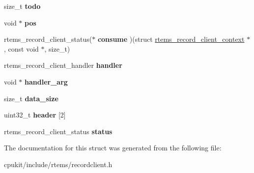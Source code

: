 \begin{DoxyCompactItemize}
\begin{tabbing}
\end{tabbing}\item 
\mbox{\label{structrtems__record__client__context_aa79b3338e18607f6ff8537067282a4dc}} 
size\+\_\+t {\bfseries todo}
\item 
\mbox{\label{structrtems__record__client__context_a1b188afbc958c16c9e7e906cd44de530}} 
void $\ast$ {\bfseries pos}
\item 
\mbox{\label{structrtems__record__client__context_ade1d2e487a5012c2ec3ca5fbecd09b71}} 
rtems\+\_\+record\+\_\+client\+\_\+status($\ast$ {\bfseries consume} )(struct \mbox{\hyperlink{structrtems__record__client__context}{rtems\+\_\+record\+\_\+client\+\_\+context}} $\ast$, const void $\ast$, size\+\_\+t)
\item 
\mbox{\label{structrtems__record__client__context_a085d18a8ac2fa974e3a50eea26dffe88}} 
rtems\+\_\+record\+\_\+client\+\_\+handler {\bfseries handler}
\item 
\mbox{\label{structrtems__record__client__context_aa93c1f5dcfc931d54cec72588d2318d0}} 
void $\ast$ {\bfseries handler\+\_\+arg}
\item 
\mbox{\label{structrtems__record__client__context_ab3f679293867b7d8bd02154e56d55919}} 
size\+\_\+t {\bfseries data\+\_\+size}
\item 
\mbox{\label{structrtems__record__client__context_a34ae30f4e6722605c415775d7672e338}} 
uint32\+\_\+t {\bfseries header} \mbox{[}2\mbox{]}
\item 
\mbox{\label{structrtems__record__client__context_ac38d6178626d331f11de4e097e40b957}} 
rtems\+\_\+record\+\_\+client\+\_\+status {\bfseries status}
\end{DoxyCompactItemize}


The documentation for this struct was generated from the following file\+:\begin{DoxyCompactItemize}
\item 
cpukit/include/rtems/recordclient.\+h\end{DoxyCompactItemize}
